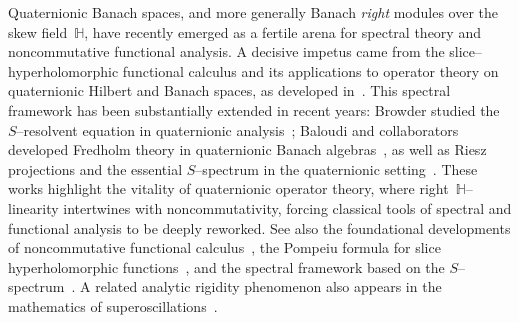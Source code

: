 \documentclass[10pt]{amsart}
\numberwithin{equation}{section}
\theoremstyle{remark}
\theoremstyle{definition}
\begin{document}
Quaternionic Banach spaces, and more generally Banach \emph{right} modules over the skew field~$\mathbb{H}$, have recently emerged as a fertile arena for spectral theory and noncommutative functional analysis. A decisive impetus came from the slice--hyperholomorphic functional calculus and its applications to operator theory on quaternionic Hilbert and Banach spaces, as developed in~\cite{ColomboSabadiniStruppa2011}. This spectral framework has been substantially extended in recent years: Browder studied the $S$--resolvent equation in quaternionic analysis~\cite{BaloudiJeribiZmouli2024}; Baloudi and collaborators developed Fredholm theory in quaternionic Banach algebras~\cite{Baloudi2023}, as well as Riesz projections and the essential $S$--spectrum in the quaternionic setting~\cite{BaloudiBelgacemJeribi2022,BaloudiJeribiZmouli2024}. These works highlight the vitality of quaternionic operator theory, where right~$\mathbb{H}$--linearity intertwines with noncommutativity, forcing classical tools of spectral and functional analysis to be deeply reworked. See also the foundational developments of noncommutative functional calculus~\cite{ColomboSabadiniStruppa2009-JFA}, the Pompeiu formula for slice hyperholomorphic functions~\cite{ColomboSabadiniStruppa2011-PAMS}, and the spectral framework based on the $S$--spectrum~\cite{ColomboGantnerKimsey2016}. A related analytic rigidity phenomenon also appears in the mathematics of superoscillations~\cite{AharonovColomboEtAl2017}.
\end{document}
